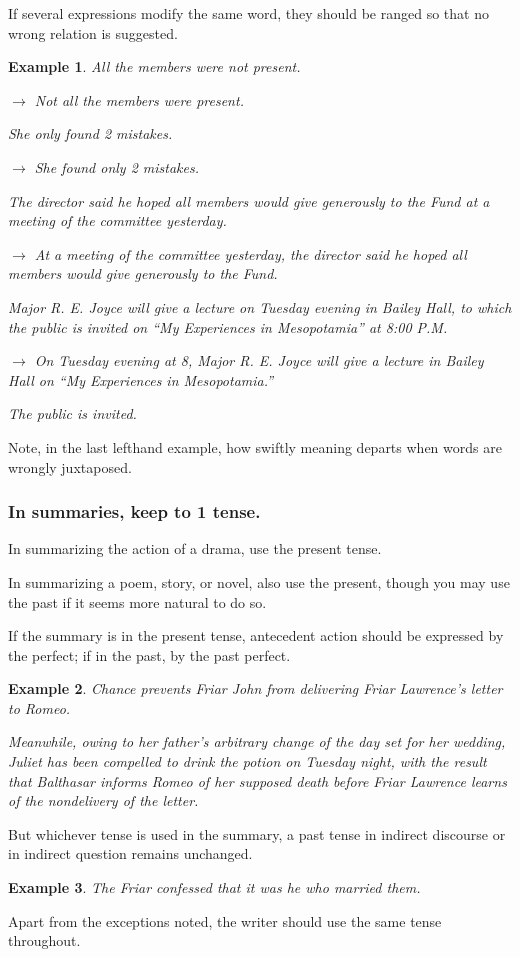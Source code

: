 \documentclass{article}
\newtheorem{example}{Example}
\begin{document}
If several expressions modify the same word, they should be ranged so that no wrong relation is suggested.
\begin{example}
	All the members were not present.
	
	$\to$ Not all the members were present.
	
	She only found 2 mistakes.
	
	$\to$ She found only 2 mistakes.
	
	The director said he hoped all members would give generously to the Fund at a meeting of the committee yesterday.
	
	$\to$ At a meeting of the committee yesterday, the director said he hoped all members would give generously to the Fund.
	
	Major R. E. Joyce will give a lecture on Tuesday evening in Bailey Hall, to which the public is invited on ``My Experiences in Mesopotamia'' at 8:00 P.M.
	
	$\to$ On Tuesday evening at 8, Major R. E. Joyce will give a lecture in Bailey Hall on ``My Experiences in Mesopotamia.''
	
	The public is invited.
\end{example}
Note, in the last lefthand example, how swiftly meaning departs when words are wrongly juxtaposed.


\subsubsection{In summaries, keep to 1 tense.}
In summarizing the action of a drama, use the present tense.

In summarizing a poem, story, or novel, also use the present, though you may use the past if it seems more natural to do so.

If the summary is in the present tense, antecedent action should be expressed by the perfect; if in the past, by the past perfect.
\begin{example}
	Chance prevents Friar John from delivering Friar Lawrence's letter to Romeo.
	
	Meanwhile, owing to her father's arbitrary change of the day set for her wedding, Juliet has been compelled to drink the potion on Tuesday night, with the result that Balthasar informs Romeo of her supposed death before Friar Lawrence learns of the nondelivery of the letter.
\end{example}
But whichever tense is used in the summary, a past tense in indirect discourse or in indirect question remains unchanged.
\begin{example}
	The Friar confessed that it was he who married them.
\end{example}
Apart from the exceptions noted, the writer should use the same tense throughout.
\end{document}
